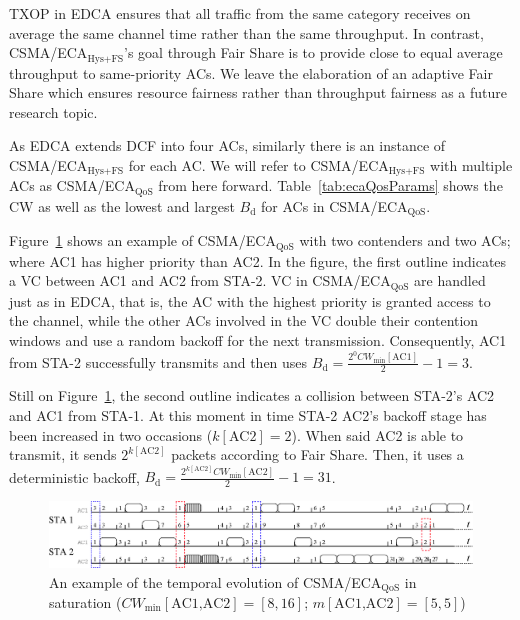 TXOP in EDCA ensures that all traffic from the same category receives on average the same channel time rather than the same throughput. In contrast, CSMA/ECA$_{\text{Hys+FS}}$'s goal through Fair Share is to provide close to equal average throughput to same-priority ACs. We leave the elaboration of an adaptive Fair Share which ensures resource fairness rather than throughput fairness as a future research topic.

As EDCA extends DCF into four ACs, similarly there is an instance of CSMA/ECA$_{\text{Hys+FS}}$ for each AC. We will refer to CSMA/ECA$_{\text{Hys+FS}}$ with multiple ACs as CSMA/ECA$_{\text{QoS}}$ from here forward. Table~\ref{tab:ecaQosParams} shows the CW as well as the lowest and largest $B_{\text{d}}$ for ACs in CSMA/ECA$_{\text{QoS}}$.

Figure~\ref{fig:ecaQoS} shows an example of CSMA/ECA$_{\text{QoS}}$ with two contenders and two ACs; where AC1 has higher priority than AC2. In the figure, the first outline indicates a VC between AC1 and AC2 from STA-2. VC in CSMA/ECA$_{\text{QoS}}$ are handled just as in EDCA, that is, the AC with the highest priority is granted access to the channel, while the other ACs involved in the VC double their contention windows and use a random backoff for the next transmission. Consequently, AC1 from STA-2 successfully transmits and then uses $B_{\text{d}}=\frac{2^{0}CW_{\min}[\text{AC1}]}{2}-1= 3$.

Still on Figure~\ref{fig:ecaQoS}, the second outline indicates a collision between STA-2's AC2 and AC1 from STA-1. At this moment in time STA-2 AC2's backoff stage has been increased in two occasions ($k[\text{AC2}]=2$). When said AC2 is able to transmit, it sends $2^{k[\text{AC2}]}$ packets according to Fair Share. Then, it uses a deterministic backoff, $B_{\text{d}}=\frac{2^{k[\text{AC2}]}CW_{\min}[\text{AC2}]}{2}-1=31$.

	\begin{figure}[tb]
	\centering
		\includegraphics[width=\linewidth]{figures/csma-eca-hew-oldScheme-fixed.eps}
		\caption{An example of the temporal evolution of CSMA/ECA$_{\text{QoS}}$ in saturation ($CW_{\min}[\text{AC1,AC2}]=[8,16]$; $m[\text{AC1,AC2}]=[5,5]$)}
		\label{fig:ecaQoS}
	\end{figure}

